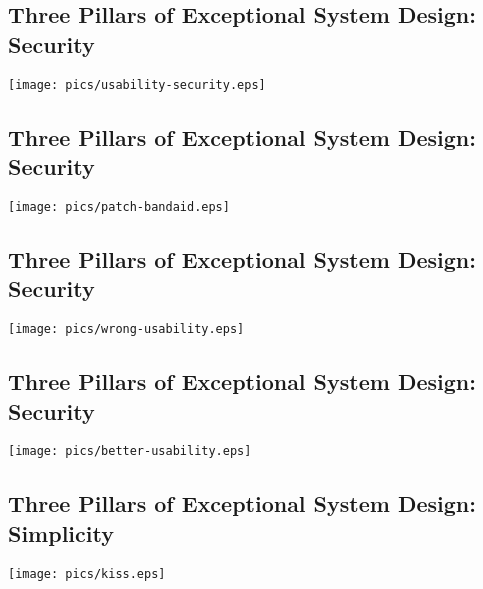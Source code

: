 \documentclass[xga]{xdvislides}
\begin{document}
\subsection{Three Pillars of Exceptional System Design: Security}
\vspace*{\fill}
\begin{center}
    \texttt{[image: pics/usability-security.eps]} \\
\end{center}
\vspace*{\fill}

\subsection{Three Pillars of Exceptional System Design: Security}
\vspace*{\fill}
\begin{center}
    \texttt{[image: pics/patch-bandaid.eps]} \\
\end{center}
\vspace*{\fill}

\subsection{Three Pillars of Exceptional System Design: Security}
\vspace*{\fill}
\begin{center}
    \texttt{[image: pics/wrong-usability.eps]} \\
\end{center}
\vspace*{\fill}

\subsection{Three Pillars of Exceptional System Design: Security}
\vspace*{\fill}
\begin{center}
    \texttt{[image: pics/better-usability.eps]} \\
\end{center}
\vspace*{\fill}


\subsection{Three Pillars of Exceptional System Design: Simplicity}
\vspace*{\fill}
\begin{center}
    \texttt{[image: pics/kiss.eps]} \\
\end{center}
\vspace*{\fill}
\end{document}
